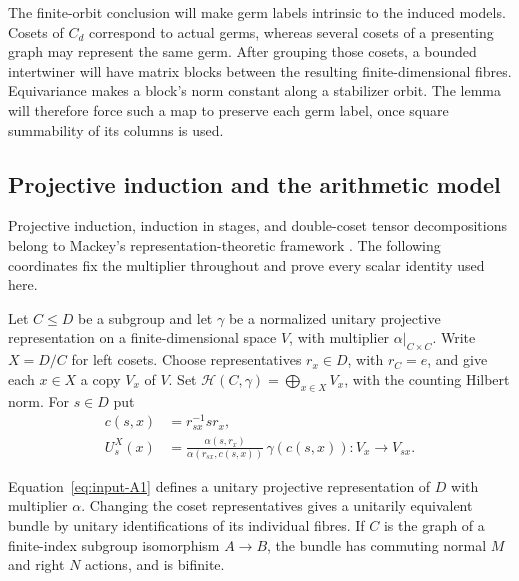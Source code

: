The finite-orbit conclusion will make germ labels intrinsic to the
induced models.  Cosets of $C_d$ correspond to actual germs, whereas
several cosets of a presenting graph may represent the same germ.
After grouping those cosets, a bounded intertwiner will have matrix
blocks between the resulting finite-dimensional fibres.  Equivariance makes a block's
norm constant along a stabilizer orbit.  The lemma will therefore force
such a map to preserve each germ label, once square summability of its
columns is used.

\subsection{Projective induction and the arithmetic model}

Projective induction, induction in stages, and double-coset tensor
decompositions belong to Mackey's representation-theoretic framework
\cite[Theorems~4.1, 4.2, and~4.6]{Mackey1958}. The following coordinates fix the
multiplier throughout and prove every scalar identity used here.

Let $C\leq D$ be a subgroup and let $\gamma$ be a normalized unitary
projective representation on a finite-dimensional space $V$, with
multiplier $\alpha|_{C\times C}$.  Write $X=D/C$ for left cosets.
Choose representatives $r_x\in D$, with $r_C=e$, and give each $x\in X$
a copy $V_x$ of $V$.  Set
$\mathcal H(C,\gamma)=\bigoplus_{x\in X}V_x$, with the counting
Hilbert norm.  For $s\in D$ put
\begin{equation}\label{eq:input-A1}
 \begin{split}
 c(s,x)&=r_{sx}^{-1}sr_x,\\
 U^X_s(x)&=
 \frac{\alpha(s,r_x)}{\alpha(r_{sx},c(s,x))}\,
 \gamma(c(s,x)):V_x\longrightarrow V_{sx}.
 \end{split}
\end{equation}

\begin{lemma}
\label{lem:calculus-induction}
Equation~\eqref{eq:input-A1} defines a unitary projective representation
of $D$ with multiplier $\alpha$.  Changing the coset representatives
gives a unitarily equivalent bundle by unitary identifications of its
individual fibres.  If $C$ is the graph of a finite-index subgroup
isomorphism $A\to B$, the bundle has commuting normal $M$ and right
$N$ actions, and is bifinite.
\end{lemma}

